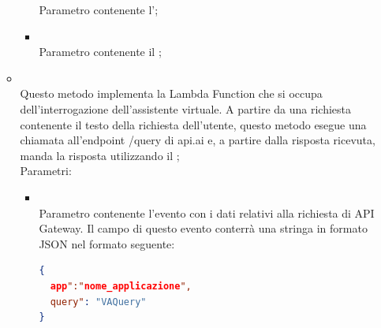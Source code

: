 \begin{itemize}
\begin{itemize}
\begin{itemize}
			Parametro contenente l';
			\item {} \\
			Parametro contenente il ;
		\end{itemize}
		\item[]  \\		Questo metodo implementa la Lambda Function che si occupa dell'interrogazione dell'assistente virtuale. A partire da una richiesta contenente il testo della richiesta dell'utente, questo metodo esegue una chiamata all'endpoint /query di api.ai e, a partire dalla risposta ricevuta, manda la risposta utilizzando il ;\\
		Parametri:
		\begin{itemize}
			\item {} \\
			Parametro contenente l'evento con i dati relativi alla richiesta di API Gateway. Il campo  di questo evento conterrà una stringa in formato JSON nel formato seguente:

\begin{lstlisting}[language=json,firstnumber=1]
{
  app":"nome_applicazione",
  query": "VAQuery"
}
\end{lstlisting}


\end{itemize}
\end{itemize}
\end{itemize}
